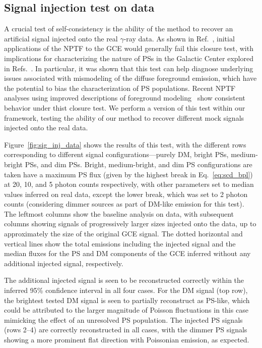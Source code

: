 \documentclass[prd,aps,10pt,nofootinbib,twocolumn,superscriptaddress,preprintnumbers,balancelastpage,longbibliography,floatfix]{revtex4-2}
\begin{document}
\subsection{Signal injection test on data}
\label{sec:sig-injection}

A crucial test of self-consistency is the ability of the method to recover an artificial signal injected onto the real $\gamma$-ray data. As shown in Ref.~\cite{Leane:2019xiy}, initial applications of the NPTF to the GCE would generally fail this closure test, with implications for characterizing the nature of PSs in the Galactic Center explored in Refs.~\cite{Chang:2019ars,Buschmann:2020adf}. In particular, it was shown that this test can help diagnose underlying issues associated with mismodeling of the diffuse foreground emission, which have the potential to bias the characterization of PS populations. Recent NPTF analyses using improved descriptions of foreground modeling~\cite{Buschmann:2020adf} show consistent behavior under thist closure test. We perform a version of this test within our framework, testing the ability of our method to recover different mock signals injected onto the real \Fermi data.

Figure~\ref{fig:sig_inj_data} shows the results of this test, with the different rows corresponding to different signal configurations---purely DM, bright PSs, medium-bright PSs, and dim PSs. Bright, medium-bright, and dim PS configurations are taken have a maximum PS flux (given by the highest break in Eq.~\eqref{eq:scd_bpl}) at 20, 10, and 5 photon counts respectively, with other parameters set to median values inferred on real \Fermi data, except the lower break, which was set to 2 photon counts (considering dimmer sources as part of DM-like emission for this test). The leftmost columns show the baseline analysis on \Fermi data, with subsequent columns showing signals of progressively larger sizes injected onto the data, up to approximately the size of the original GCE signal. The dotted horizontal and vertical lines show the total emissions including the injected signal and the median fluxes for the PS and DM components of the GCE inferred without any additional injected signal, respectively. 

The additional injected signal is seen to be reconstructed correctly within the inferred 95\% confidence interval in all four cases. For the DM signal (top row), the brightest tested DM signal is seen to partially reconstruct as PS-like, which could be attributed to the larger magnitude of Poisson fluctuations in this case mimicking the effect of an unresolved PS population. The injected PS signals (rows 2--4) are correctly reconstructed in all cases, with the dimmer PS signals showing a more prominent flat direction with Poissonian emission, as expected.
\end{document}
